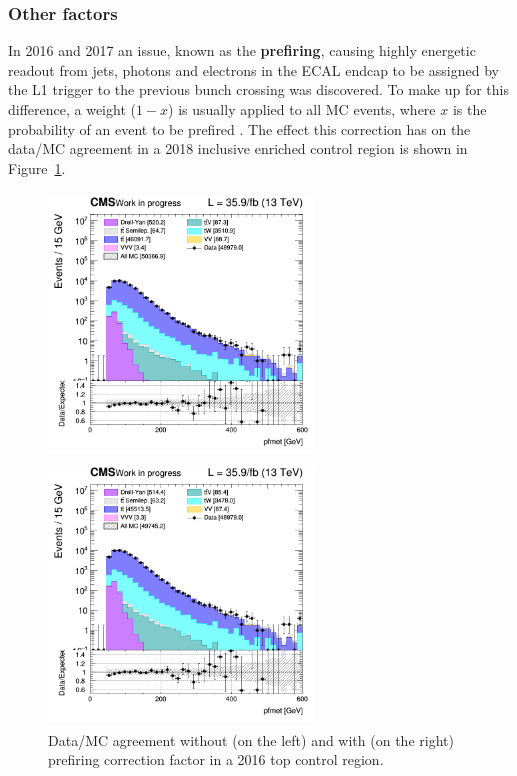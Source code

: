 \documentclass[a4paper, 10pt, openright]{report}
\begin{document}
\subsubsection*{Other factors}

In 2016 and 2017 an issue, known as the \textbf{prefiring}, causing highly energetic readout from jets, photons and electrons in the \ac{ECAL} endcap to be assigned by the \ac{L1} trigger to the previous bunch crossing was discovered. To make up for this difference, a weight ($1-x$) is usually applied to all \ac{MC} events, where $x$ is the probability of an event to be prefired \cite{Prefire}. The effect this correction has on the data/\ac{MC} agreement in a 2018 inclusive enriched control region is shown in Figure~\ref{fig:Prefiring}.

\begin{figure}[htbp]
\begin{center}
\begin{minipage}[b]{.48\textwidth}
\includegraphics[width=7cm, height=7cm]{figs/log_cratio_ttbarCR_ll_METcorrected_pt_no_prefire.png}
\end{minipage} \hfill
\begin{minipage}[b]{.48\textwidth}
\includegraphics[width=7cm, height=7cm]{figs/log_cratio_ttbarCR_ll_METcorrected_pt_prefire.png}
\end{minipage} \hfill
\caption{Data/\ac{MC} agreement without (on the left) and with (on the right) prefiring correction factor in a 2016 top control region.}
\label{fig:Prefiring}
\end{center}
\end{figure}
\end{document}
